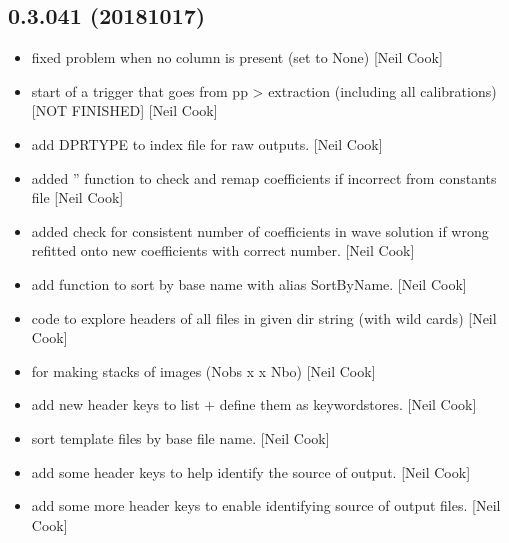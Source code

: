 \documentclass[a4paper,10pt,english]{report}
\begin{document}
\subsection{0.3.041 (2018\sphinxhyphen{}10\sphinxhyphen{}17)}
\label{\detokenize{misc/changelog:id309}}\begin{itemize}
\item {} 
 \sphinxhyphen{} fixed problem when no column is present (set to
None) {[}Neil Cook{]}

\item {} 
 \sphinxhyphen{} start of a trigger that goes from pp \textendash{}\textgreater{}
extraction (including all calibrations) \sphinxhyphen{} {[}NOT FINISHED{]} {[}Neil Cook{]}

\item {} 
 \sphinxhyphen{} add DPRTYPE to index file for raw outputs. {[}Neil
Cook{]}

\item {} 
 \sphinxhyphen{} added ” function to check
and remap coefficients if incorrect from constants file
 {[}Neil Cook{]}

\item {} 
  \sphinxhyphen{} added check for consistent number of coefficients
in wave solution \sphinxhyphen{} if wrong refitted onto new coefficients with
correct number. {[}Neil Cook{]}

\item {} 
 \sphinxhyphen{} add function to sort by base name  with
alias SortByName. {[}Neil Cook{]}

\item {} 
 \sphinxhyphen{} code to explore headers of all files in given dir
string (with wild cards) {[}Neil Cook{]}

\item {} 
 \sphinxhyphen{} for making stacks of images (Nobs x  x
Nbo) {[}Neil Cook{]}

\item {} 
 \sphinxhyphen{} add new header keys to list + define them as
keywordstores. {[}Neil Cook{]}

\item {} 
 \sphinxhyphen{} sort template files by base file name. {[}Neil
Cook{]}

\item {} 
 \sphinxhyphen{} add some header keys to help identify the
source of output. {[}Neil Cook{]}

\item {} 
 \sphinxhyphen{} add some more header keys to enable
identifying source of output files. {[}Neil Cook{]}

\end{itemize}
\end{document}
